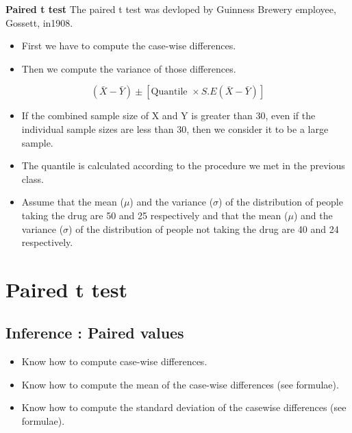 \documentclass[]{report}
\begin{document}

\textbf{Paired t test}
The paired t test was devloped by Guinness Brewery employee, Gossett, in1908.
\begin{itemize}
\item First we have to compute the case-wise differences.
\item Then we compute the variance of those differences.
\end{itemize}







\[ ( \bar{X} - \bar{Y} ) \pm \left[ \mbox{Quantile } \times S.E(\bar{X}-\bar{Y}) \right] \]
\begin{itemize}
\item If the combined sample size of X and Y is greater than 30, even if the individual sample sizes are less than 30, then we consider it to be a large sample.
\item The quantile is calculated according to the procedure we met in the previous class.
\end{itemize}

\begin{itemize}
\item Assume that the mean ($\mu$) and the variance ($\sigma$) of the distribution
of people taking the drug are 50 and 25 respectively and that the mean ($\mu$)
and the variance ($\sigma$) of the distribution of people not taking the drug are
40 and 24 respectively.
\end{itemize}









\section{Paired t test}

{
\subsection{Inference : Paired values}

\begin{itemize}

\item Know how to compute case-wise differences.
\item Know how to compute the mean of the case-wise differences (see formulae). 
\item Know how to compute the standard deviation of the casewise differences (see formulae).
\end{itemize} 
}
\end{document}

